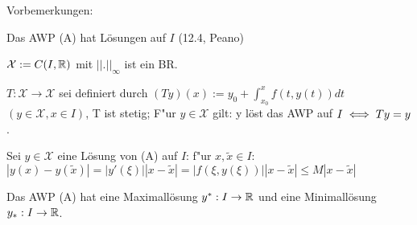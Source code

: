 \documentclass{article}
\begin{document}
Vorbemerkungen: 
\begin{liste}
\item Das AWP (A) hat Lösungen auf $I$ (12.4, Peano)
\item $\mathcal{X} := C(I,\mathbb{R})$ mit $||.||_{\infty}$ ist ein BR.
\item $T:\mathcal{X} \to \mathcal{X}$ sei definiert durch $(Ty)(x) := y_0 + \int_{x_0}^{x} f(t,y(t)) dt$  $(y\in \mathcal{X}, x\in I)$, T ist stetig;
F"ur $y \in \mathcal{X}$ gilt: y löst das AWP auf $I \iff Ty = y$.
\item Sei $y \in \mathcal{X}$ eine Lösung von (A) auf $I$: f"ur $x, \tilde{x} \in I$:
$| y(x) - y(\tilde{x}) | = |y'(\xi)| | x - \tilde{x}| = |f(\xi,y(\xi))| | x - \tilde{x}| \leq M | x - \tilde{x}|$
\end{liste}

\begin{satz}
Das AWP (A) hat eine Maximallösung $y^*: I \to \mathbb{R}$ und eine Minimallösung $y_*:I \to \mathbb{R}$.
\end{satz}
\end{document}
